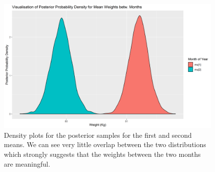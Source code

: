 \documentclass[journal, a4paper]{IEEEtran}
\begin{document}
\begin{figure}[h!]
	\includegraphics[width=\linewidth]{../plots/07_post_dist_weights.png}
	\caption{Density plots for the posterior samples for the first and second means. We can see very little overlap between the two distributions which strongly
	suggests that the weights between the two months are meaningful.}
	\label{fig:9}
\end{figure}
\end{document}
